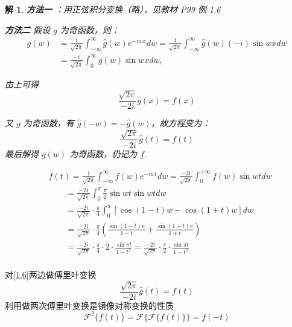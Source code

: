 \documentclass[12pt,a4paper]{article}
\numberwithin{subsection}{section}   %
\numberwithin{subsubsection}{subsection}
\theoremstyle{plain}
\newtheorem{solution}{解}[subsection]  %
\theoremstyle{definition}
\theoremstyle{remark}
\theoremstyle{remark}
\begin{document}
\begin{solution}
\textbf{方法一}	：用正弦积分变换（略），见教材 P99 例 1.6

\textbf{方法二}
		假设 \(g\) 为奇函数，则：
	\begin{equation}
		\begin{aligned}
			g(w) &= \frac{1}{\sqrt{2 \pi}} \int_{-\infty}^{\infty} \hat{g}(w) e^{-i w x} dw = \frac{1}{\sqrt{2 \pi}} \int_{-\infty}^{\infty} \hat{g}(w) (-i) \sin w x dw \\[8pt]
			&= \frac{-i}{\sqrt{2 \pi}} \int_0^{\infty} g(w) \sin w x dw,
		\end{aligned}
	\end{equation}
		
		由上可得
		\begin{equation}
 \frac{\sqrt{2 \pi}}{-2 i} \hat{g}(x) = f(x)
\end{equation}

 又 \(g\) 为奇函数，有 \(\hat{g}(-w) = -\hat{g}(w)\)，故方程变为：
	\begin{equation}\label{1.6}
		\frac{\sqrt{2 \pi}}{-2 i} \hat{g}(t) = f(t)
	\end{equation}
	最后解得 \(g(w)\) 为奇函数，仍记为 \(f\).
\end{solution}

\begin{equation}
	\begin{aligned}
		& f(t)=\frac{1}{\sqrt{2\pi}}\int_{-\infty}^{\infty} f(w)e^{-iwt}dw=\frac{-2i}{\sqrt{2\pi}}\int_0^{+\infty}f(w)\sin w t dw \\[8pt]
		&\qquad=\frac{-2i}{\sqrt{2\pi}}\int_0^\pi \frac{\pi}{2}\sin w t\sin w t dw \\[8pt]
		&\qquad=\frac{-2i}{\sqrt{2\pi}}\cdot\frac{\pi}{4}\int_0^\pi [\cos(1-t)w-\cos(1+t)w] dw \\[8pt]
		&\qquad=\frac{-2i}{\sqrt{2\pi}}\cdot\frac{\pi}{4}\left( \frac{\sin(1-t)\pi}{1-t}+\frac{\sin(1+t)\pi}{1+t} \right) \\[8pt]
		&\qquad=\frac{-2i}{\sqrt{2\pi}}\cdot\frac{\pi}{4}\cdot 2\cdot\frac{\sin\pi t}{1-t^2}=\frac{-2i}{\sqrt{2\pi}}\cdot\frac{\pi}{2}\cdot\frac{\sin \pi t}{1-t^2} \\
	\end{aligned}
\end{equation}

对\eqref{1.6}两边做傅里叶变换
\begin{equation}
	\frac{\sqrt{2\pi}}{-2i} \hat{g}(t) = f(t)
\end{equation}
利用做两次傅里叶变换是镜像对称变换的性质
\begin{equation}\label{2f}
	\mathcal{F}^{2}\{f(t)\} = \mathcal{F}\{\mathcal{F}\{f(t)\}\} = f(-t)
\end{equation}
\end{document}

